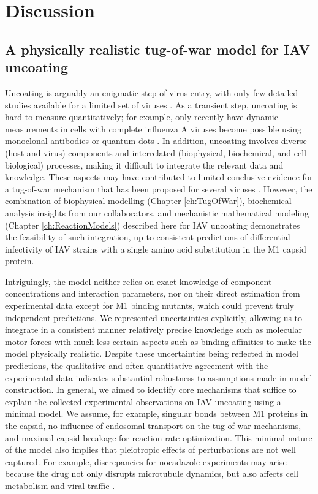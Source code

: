 \section{Discussion}

\subsection{A physically realistic tug-of-war model for IAV uncoating}

Uncoating is arguably an enigmatic step of virus entry, with only few detailed studies available for a limited set of viruses \cite{helenius2018virus, walsh2019exploitation}. As a transient step, uncoating is hard to measure quantitatively; for example, only recently have dynamic measurements in cells with complete influenza A viruses become possible using monoclonal antibodies \cite{banerjee2014influenza} or quantum dots \cite{qin2019real}. In addition, uncoating involves diverse (host and virus) components and interrelated (biophysical, biochemical, and cell biological) processes, making it difficult to integrate the relevant data and knowledge. These aspects may have contributed to limited conclusive evidence for a tug-of-war mechanism that has been proposed for several viruses \cite{banerjee2014influenza, lukic2014hiv, radtke2010plus, strunze2011kinesin}. However, the combination of biophysical modelling (Chapter \ref{ch:TugOfWar}), biochemical analysis insights from our collaborators, and mechanistic mathematical modeling (Chapter \ref{ch:ReactionModels}) described here for IAV uncoating demonstrates the feasibility of such integration, up to consistent predictions of differential infectivity of IAV strains with a single amino acid substitution in the M1 capsid protein.

Intriguingly, the model neither relies on exact knowledge of component concentrations and interaction parameters, nor on their direct estimation from experimental data except for M1 binding mutants, which could prevent truly independent predictions. We represented uncertainties explicitly, allowing us to integrate in a consistent manner relatively precise knowledge such as molecular motor forces with much less certain aspects such as binding affinities to make the model physically realistic. Despite these uncertainties being reflected in model predictions, the qualitative and often quantitative agreement with the experimental data indicates substantial robustness to assumptions made in model construction. In general, we aimed to identify core mechanisms that suffice to explain the collected experimental observations on IAV uncoating using a minimal model. We assume, for example, singular bonds between M1 proteins in the capsid, no influence of endosomal transport on the tug-of-war mechanisms, and maximal capsid breakage for reaction rate optimization. This minimal nature of the model also implies that pleiotropic effects of perturbations are not well captured. For example, discrepancies for nocadazole experiments may arise because the drug not only disrupts microtubule dynamics, but also affects cell metabolism and viral traffic \cite{naghavi2017microtubule}.

